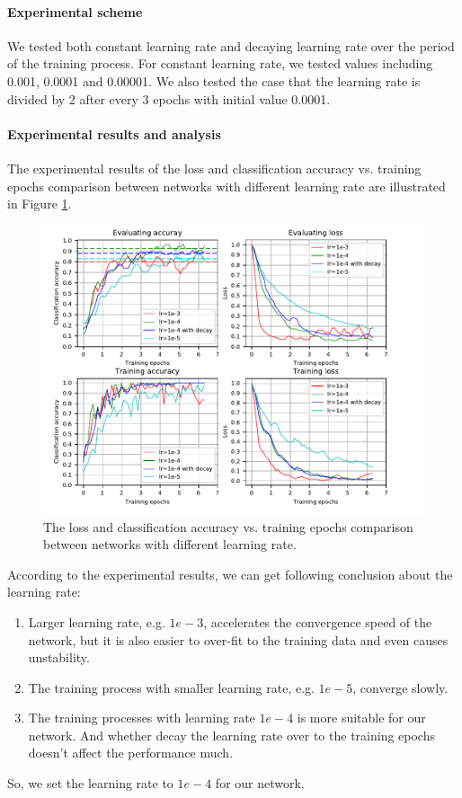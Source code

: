 \paragraph{Experimental scheme}
We tested both constant learning rate and decaying learning rate over the period of the training process.  For constant learning rate, we tested values including 0.001, 0.0001 and 0.00001. We also tested the case that the learning rate is divided by 2 after every 3 epochs with initial value 0.0001.
 
\paragraph{Experimental results and analysis}
The experimental results of the loss and classification accuracy vs. training epochs comparison between networks with different learning rate are illustrated in Figure \ref{fig:plot_lr}.
 \begin{figure}
	\includegraphics[trim=0cm 0cm 0cm 0cm]{fig01/plot_lr.pdf}
	\caption{The loss and classification accuracy vs. training epochs comparison between networks with different learning rate.}
	\label{fig:plot_lr}
\end{figure}
According to the experimental results, we can get following conclusion about the learning rate:
\begin{enumerate}
	\item Larger learning rate, e.g. \(1e-3\), accelerates the convergence speed of the network, but it is also easier to over-fit to the training data and even causes unstability.
	\item The training process with smaller learning rate, e.g. \(1e-5\), converge slowly. 
	\item The training processes with learning rate \(1e-4\) is more suitable for our network. And whether decay the learning rate over to the training epochs doesn't affect the performance much.   
\end{enumerate}
So, we set the learning rate to \(1e-4\) for our network.

